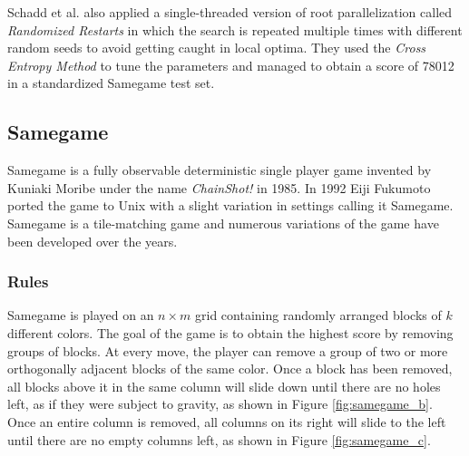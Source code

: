 \medskip\noindent
Schadd et al. \cite{DBLP:journals/kbs/SchaddWTU12} also applied a single-threaded version of root parallelization \cite{10.1007/978-3-540-87608-3_6} called \textit{Randomized Restarts} in which the search is repeated multiple times with different random seeds to avoid getting caught in local optima.
They used the \textit{Cross Entropy Method} \cite{Rubinstein1999} to tune the parameters and managed to obtain a score of 78012 in a standardized Samegame test set.

\subsection{Samegame}\label{sec:samegame}
Samegame is a fully observable deterministic single player game invented by Kuniaki Moribe under the name \textit{ChainShot!} in 1985.  In 1992 Eiji Fukumoto ported the game to Unix with a slight variation in settings calling it Samegame. Samegame is a tile-matching game and numerous variations of the game have been developed over the years.

\subsubsection{Rules}
Samegame is played on an $n\times m$ grid containing randomly arranged blocks of $k$ different colors. The goal of the game is to obtain the highest score by removing groups of blocks. At every move, the player can remove a group of two or more orthogonally adjacent blocks of the same color. Once a block has been removed, all blocks above it in the same column will slide down until there are no holes left, as if they were subject to gravity, as shown in Figure \ref{fig:samegame_b}. Once an entire column is removed, all columns on its right will slide to the left until there are no empty columns left, as shown in Figure \ref{fig:samegame_c}.

